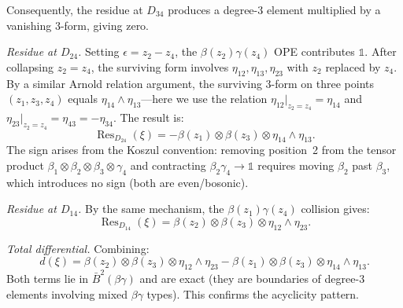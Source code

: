 \begin{computation}
Consequently, the residue at $D_{34}$ produces a
degree-$3$ element multiplied by a vanishing $3$-form, giving
zero.

\emph{Residue at $D_{24}$.}
Setting $\epsilon = z_2 - z_4$, the $\beta(z_2)\gamma(z_4)$ OPE
contributes $\mathbb{1}$.  After collapsing $z_2 = z_4$, the surviving
form involves $\eta_{12}, \eta_{13}, \eta_{23}$ with $z_2$ replaced
by $z_4$.  By a similar Arnold relation argument, the surviving
$3$-form on three points $(z_1, z_3, z_4)$ equals
$\eta_{14} \wedge \eta_{13}$---here we use the relation
$\eta_{12}|_{z_2 = z_4} = \eta_{14}$ and
$\eta_{23}|_{z_2 = z_4} = \eta_{43} = -\eta_{34}$.  The result is:
\begin{equation}\label{eq:bbbg-D24-residue}
\operatorname{Res}_{D_{24}}(\xi) =
-\beta(z_1) \otimes \beta(z_3) \otimes \eta_{14} \wedge \eta_{13}.
\end{equation}
The sign arises from the Koszul convention: removing position~2
from the tensor product $\beta_1 \otimes \beta_2 \otimes \beta_3
\otimes \gamma_4$ and contracting $\beta_2 \gamma_4 \to \mathbb{1}$
requires moving $\beta_2$ past $\beta_3$, which introduces no sign
(both are even/bosonic).

\emph{Residue at $D_{14}$.}
By the same mechanism, the $\beta(z_1)\gamma(z_4)$ collision gives:
\begin{equation}\label{eq:bbbg-D14-residue}
\operatorname{Res}_{D_{14}}(\xi) =
\beta(z_2) \otimes \beta(z_3) \otimes \eta_{12} \wedge \eta_{23}.
\end{equation}

\emph{Total differential.} Combining:
\begin{equation}\label{eq:bbbg-total}
d(\xi) = \beta(z_2) \otimes \beta(z_3) \otimes \eta_{12}
\wedge \eta_{23}
- \beta(z_1) \otimes \beta(z_3) \otimes \eta_{14}
\wedge \eta_{13}.
\end{equation}
Both terms lie in $\bar{B}^2(\beta\gamma)$ and are exact
(they are boundaries of degree-$3$ elements involving mixed
$\beta\gamma$ types).  This confirms the acyclicity pattern.
\end{computation}

